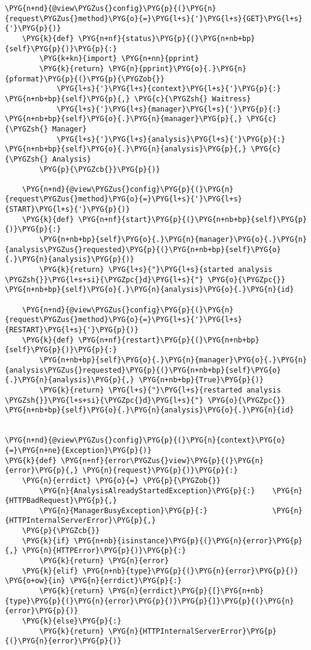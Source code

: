 \begin{Verbatim}[commandchars=\\\{\}]
    \PYG{n+nd}{@view\PYGZus{}config}\PYG{p}{(}\PYG{n}{request\PYGZus{}method}\PYG{o}{=}\PYG{l+s}{'}\PYG{l+s}{GET}\PYG{l+s}{'}\PYG{p}{)}
    \PYG{k}{def} \PYG{n+nf}{status}\PYG{p}{(}\PYG{n+nb+bp}{self}\PYG{p}{)}\PYG{p}{:}
        \PYG{k+kn}{import} \PYG{n+nn}{pprint}
        \PYG{k}{return} \PYG{n}{pprint}\PYG{o}{.}\PYG{n}{pformat}\PYG{p}{(}\PYG{p}{\PYGZob{}}
            \PYG{l+s}{'}\PYG{l+s}{context}\PYG{l+s}{'}\PYG{p}{:} \PYG{n+nb+bp}{self}\PYG{p}{,} \PYG{c}{\PYGZsh{} Waitress}
            \PYG{l+s}{'}\PYG{l+s}{manager}\PYG{l+s}{'}\PYG{p}{:} \PYG{n+nb+bp}{self}\PYG{o}{.}\PYG{n}{manager}\PYG{p}{,} \PYG{c}{\PYGZsh{} Manager}
            \PYG{l+s}{'}\PYG{l+s}{analysis}\PYG{l+s}{'}\PYG{p}{:} \PYG{n+nb+bp}{self}\PYG{o}{.}\PYG{n}{analysis}\PYG{p}{,} \PYG{c}{\PYGZsh{} Analysis}
        \PYG{p}{\PYGZcb{}}\PYG{p}{)}

    \PYG{n+nd}{@view\PYGZus{}config}\PYG{p}{(}\PYG{n}{request\PYGZus{}method}\PYG{o}{=}\PYG{l+s}{'}\PYG{l+s}{START}\PYG{l+s}{'}\PYG{p}{)}
    \PYG{k}{def} \PYG{n+nf}{start}\PYG{p}{(}\PYG{n+nb+bp}{self}\PYG{p}{)}\PYG{p}{:}
        \PYG{n+nb+bp}{self}\PYG{o}{.}\PYG{n}{manager}\PYG{o}{.}\PYG{n}{analysis\PYGZus{}requested}\PYG{p}{(}\PYG{n+nb+bp}{self}\PYG{o}{.}\PYG{n}{analysis}\PYG{p}{)}
        \PYG{k}{return} \PYG{l+s}{"}\PYG{l+s}{started analysis \PYGZsh{}}\PYG{l+s+si}{\PYGZpc{}d}\PYG{l+s}{"} \PYG{o}{\PYGZpc{}} \PYG{n+nb+bp}{self}\PYG{o}{.}\PYG{n}{analysis}\PYG{o}{.}\PYG{n}{id}

    \PYG{n+nd}{@view\PYGZus{}config}\PYG{p}{(}\PYG{n}{request\PYGZus{}method}\PYG{o}{=}\PYG{l+s}{'}\PYG{l+s}{RESTART}\PYG{l+s}{'}\PYG{p}{)}
    \PYG{k}{def} \PYG{n+nf}{restart}\PYG{p}{(}\PYG{n+nb+bp}{self}\PYG{p}{)}\PYG{p}{:}
        \PYG{n+nb+bp}{self}\PYG{o}{.}\PYG{n}{manager}\PYG{o}{.}\PYG{n}{analysis\PYGZus{}requested}\PYG{p}{(}\PYG{n+nb+bp}{self}\PYG{o}{.}\PYG{n}{analysis}\PYG{p}{,} \PYG{n+nb+bp}{True}\PYG{p}{)}
        \PYG{k}{return} \PYG{l+s}{"}\PYG{l+s}{restarted analysis \PYGZsh{}}\PYG{l+s+si}{\PYGZpc{}d}\PYG{l+s}{"} \PYG{o}{\PYGZpc{}} \PYG{n+nb+bp}{self}\PYG{o}{.}\PYG{n}{analysis}\PYG{o}{.}\PYG{n}{id}


\PYG{n+nd}{@view\PYGZus{}config}\PYG{p}{(}\PYG{n}{context}\PYG{o}{=}\PYG{n+ne}{Exception}\PYG{p}{)}
\PYG{k}{def} \PYG{n+nf}{error\PYGZus{}view}\PYG{p}{(}\PYG{n}{error}\PYG{p}{,} \PYG{n}{request}\PYG{p}{)}\PYG{p}{:}
    \PYG{n}{errdict} \PYG{o}{=} \PYG{p}{\PYGZob{}}
        \PYG{n}{AnalysisAlreadyStartedException}\PYG{p}{:}    \PYG{n}{HTTPBadRequest}\PYG{p}{,}
        \PYG{n}{ManagerBusyException}\PYG{p}{:}               \PYG{n}{HTTPInternalServerError}\PYG{p}{,}
    \PYG{p}{\PYGZcb{}}
    \PYG{k}{if} \PYG{n+nb}{isinstance}\PYG{p}{(}\PYG{n}{error}\PYG{p}{,} \PYG{n}{HTTPError}\PYG{p}{)}\PYG{p}{:}
        \PYG{k}{return} \PYG{n}{error}
    \PYG{k}{elif} \PYG{n+nb}{type}\PYG{p}{(}\PYG{n}{error}\PYG{p}{)} \PYG{o+ow}{in} \PYG{n}{errdict}\PYG{p}{:}
        \PYG{k}{return} \PYG{n}{errdict}\PYG{p}{[}\PYG{n+nb}{type}\PYG{p}{(}\PYG{n}{error}\PYG{p}{)}\PYG{p}{]}\PYG{p}{(}\PYG{n}{error}\PYG{p}{)}
    \PYG{k}{else}\PYG{p}{:}
        \PYG{k}{return} \PYG{n}{HTTPInternalServerError}\PYG{p}{(}\PYG{n}{error}\PYG{p}{)}



\end{Verbatim}
